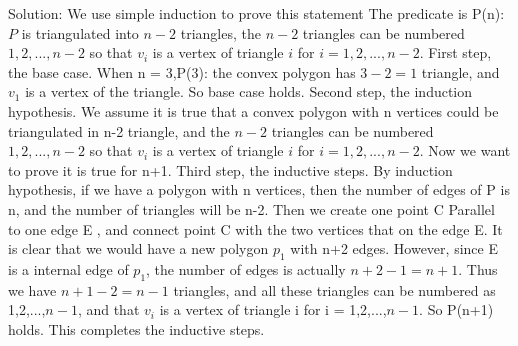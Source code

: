 \documentclass[12pt]{article}
\begin{document}
Solution: We use simple induction to prove this statement\vskip5pt
The predicate is P(n): $P$ is triangulated into $n - 2$ triangles, 
          the $n - 2$ triangles can be numbered $1, 2, ..., n - 2$ so that $v_i$ is a vertex of 
          triangle $i$ for $i = 1, 2, ..., n-2$. \vskip5pt
First step, the base case. When n = 3,P(3): the convex polygon has $3-2 = 1$  triangle, and $v_1$ is a vertex of the triangle. So base case holds.\vskip5pt
Second step, the induction hypothesis. We assume it is true that a convex polygon with n vertices could be triangulated in n-2 triangle, and the $n - 2$ triangles can be numbered $1, 2, ..., n - 2$ so that $v_i$ is a vertex of 
          triangle $i$ for $i = 1, 2, ..., n-2$.  Now we want to prove it is true for n+1.\vskip5pt
Third step, the inductive steps.  By induction hypothesis, if we have a polygon with n vertices, then the number of edges of P is n, and the number of triangles will be n-2. \vskip5pt
Then we create one point C Parallel to one edge E , and connect point C with the two vertices that on the edge E. It is clear that we would have a new polygon $p_1$ with n+2 edges. However, since E is a internal edge of $p_1$, the number of edges is actually $n+2-1 = n+1$. Thus we have $n+1-2 = n-1$ triangles, and all these triangles can be numbered as 1,2,...,$n-1$, and that $v_i$ is a vertex of triangle i for i = 1,2,...,$n-1$. So P(n+1) holds. This completes the inductive steps.
\end{document}
